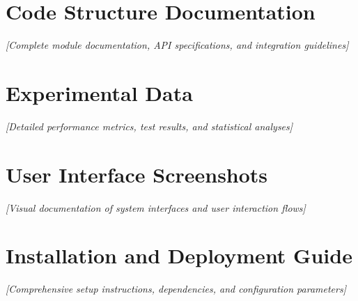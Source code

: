 \documentclass{bscs}
\begin{document}
\chapter{Code Structure Documentation}

\textit{[Complete module documentation, API specifications, and integration guidelines]}

\chapter{Experimental Data}

\textit{[Detailed performance metrics, test results, and statistical analyses]}

\chapter{User Interface Screenshots}

\textit{[Visual documentation of system interfaces and user interaction flows]}

\chapter{Installation and Deployment Guide}

\textit{[Comprehensive setup instructions, dependencies, and configuration parameters]}
\end{document}
